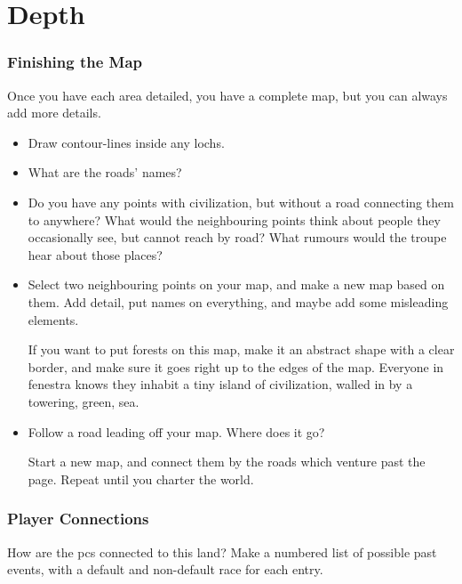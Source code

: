 \foragingChart

\section{Depth}
\label{mapDepth}

\begin{multicols}{2}

\subsubsection{Finishing the Map}

\noindent
Once you have each area detailed, you have a complete map, but you can always add more details.

\begin{itemize}
  \item
  Draw contour-lines inside any lochs.
  \item
  What are the roads' names?
  \item
  Do you have any points with civilization, but without a road connecting them to anywhere?
  What would the neighbouring points think about people they occasionally see, but cannot reach by road?
  What rumours would the troupe hear about those places?
  \item
  Select two neighbouring points on your map, and make a new map based on them.
  Add detail, put names on everything, and maybe add some misleading elements.

  If you want to put forests on this map, make it an abstract shape with a clear border, and make sure it goes right up to the edges of the map.
  Everyone in \gls{fenestra} knows they inhabit a tiny island of civilization, walled in by a towering, green, sea.
  \item
  Follow a road leading off your map.
  Where does it go?

  Start a new map, and connect them by the roads which venture past the page.
  Repeat until you charter the world.
\end{itemize}

\bigLine

\subsubsection{Player Connections}

How are the \glspl{pc} connected to this land?
Make a numbered list of possible past events, with a default and non-default race for each entry.


\end{multicols}
